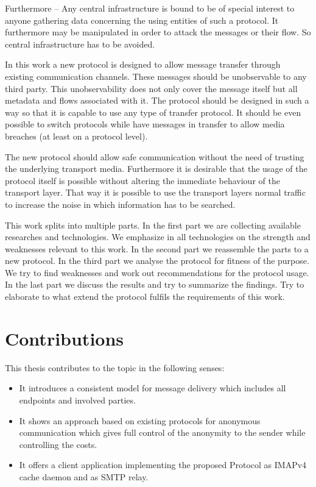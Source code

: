 Furthermore -- Any central infrastructure is bound to be of special interest to anyone gathering data concerning the using entities of such a protocol. It furthermore may be manipulated in order to attack the messages or their flow. So central infrastructure has to be avoided.

In this work a new protocol is designed to allow message transfer through existing communication channels. These messages should be unobservable to any third party. This unobservability does not only cover the message itself but all metadata and flows associated with it. The protocol should be designed in such a way so that it is capable to use any type of transfer protocol. It should be even possible to switch protocols while have messages in transfer to allow media breaches (at least on a protocol level).

The new protocol should allow safe communication without the need of trusting the underlying transport media. Furthermore it is desirable that the usage of the protocol itself is possible without altering the immediate behaviour of the transport layer. That way it is possible to use the transport layers normal traffic to increase the noise in which information has to be searched. 

This work splits into multiple parts. In the first part we are collecting available researches and technologies. We emphasize in all technologies on the strength and weaknesses relevant to this work. In the second part we reassemble the parts to a new protocol. In the third part we analyse the protocol for fitness of the purpose. We try to find weaknesses and work out recommendations for the protocol usage. In the last part we discuss the results and try to summarize the findings. Try to elaborate to what extend the protocol fulfils the requirements of this work.

\section{Contributions}
This thesis contributes to the topic in the following senses:
\begin{itemize}
	\item It introduces a consistent model for message delivery which includes all endpoints and involved parties.
	\item It shows an approach based on existing protocols for anonymous communication which gives full control of the anonymity to the sender while controlling the costs.
	\item It offers a client application implementing the proposed Protocol as IMAPv4 cache daemon and as SMTP relay.
\end{itemize}

